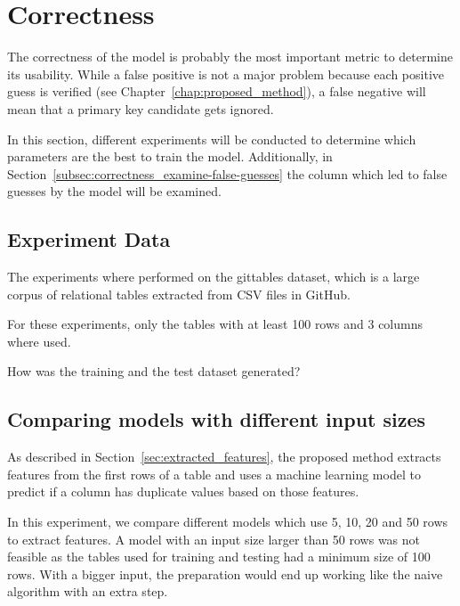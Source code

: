 \section{Correctness}\label{sec:correctness}
The correctness of the model is probably the most important metric to determine its usability. While a false positive is not a major problem because each positive guess is verified (see Chapter~\ref{chap:proposed_method}), a false negative will mean that a primary key candidate gets ignored.

In this section, different experiments will be conducted to determine which parameters are the best to train the model. Additionally, in Section~\ref{subsec:correctness_examine-false-guesses} the column which led to false guesses by the model will be examined.


\subsection{Experiment Data}\label{subsec:correctness_experiment-data} %
The experiments where performed on the gittables dataset, which is a large corpus of relational tables extracted from CSV files in GitHub\cite{gittables-article}.

For these experiments, only the tables with at least 100 rows and 3 columns where used. %

How was the training and the test dataset generated? %


\subsection{Comparing models with different input sizes}\label{subsec:correctness_comparing-input-size}
As described in Section~\ref{sec:extracted_features}, the proposed method extracts features from the first rows of a table and uses a machine learning model to predict if a column has duplicate values based on those features. %

In this experiment, we compare different models which use \num{5}, \num{10}, \num{20} and \num{50} rows to extract features. A model with an input size larger than \num{50} rows was not feasible as the tables used for training and testing had a minimum size of \num{100} rows. With a bigger input, the preparation would end up working like the naive algorithm with an extra step.


